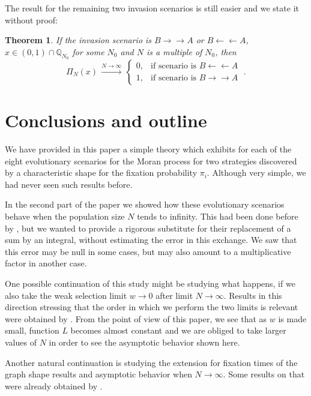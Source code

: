\documentclass[12pt]{article}
\newtheorem{theorem}{Theorem}
\begin{document}
The result for the remaining two invasion scenarios is still easier and we state it without proof:
\begin{theorem}
	If the invasion scenario is $B\rightarrow \rightarrow A$ or $B\leftarrow \leftarrow A$, $x \in (0,1) \cap \mathbb{Q}_{N_0}$ for some $N_0$ and $N$ is a multiple of $N_0$, then
	\begin{equation} \label{Pidominance}
	\Pi_N(x) \,\stackrel{N \rightarrow \infty}{\rightarrow}\, \begin{cases} 0, &\mbox{if scenario is } B\leftarrow \leftarrow A  \\ 
	\displaystyle 1, & \mbox{if scenario is } B\rightarrow \rightarrow A \end{cases} \;.
	\end{equation}
\end{theorem}

\section{Conclusions and outline}\label{secconc}
We have provided in this paper a simple theory which exhibits for each of the eight evolutionary scenarios for the Moran process for two strategies discovered by \cite{taylor} a characteristic shape for the fixation probability $\pi_i$. Although very simple, we had never seen such results before.

In the second part of the paper we showed how these evolutionary scenarios behave when the population size $N$ tends to infinity. This had been done before by \cite{AntalScheuring}, but we wanted to provide a rigorous substitute for their replacement of a sum by an integral, without estimating the error in this exchange. We saw that this error may be null in some cases, but may also amount to a multiplicative factor in another case.

One possible continuation of this study might be studying what happens, if we also take the weak selection limit $w \rightarrow 0$ after limit $N \rightarrow \infty$. Results in this direction stressing that the order in which we perform the two limits is relevant were obtained by \cite{SampleAllen}. From the point of view of this paper, we see that as $w$ is made small, function $L$ becomes almost constant and we are obliged to take larger values of $N$ in order to see the asymptotic behavior shown here.

Another natural continuation is studying the extension for fixation times of the graph shape results and asymptotic behavior when $N \rightarrow \infty$. Some results on that were already obtained by \cite{AntalScheuring}.
\end{document}
